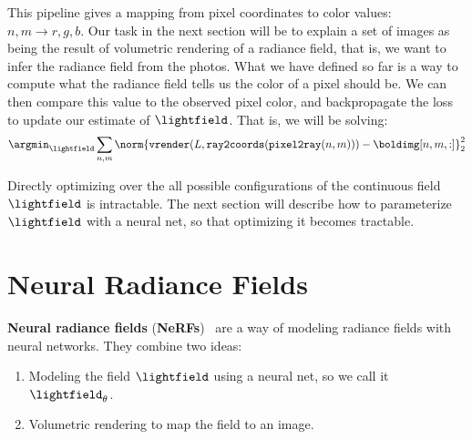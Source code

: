 This pipeline gives a mapping from pixel coordinates to color values: $n,m \rightarrow r,g,b$. Our task in the next section will be to explain a set of images as being the result of volumetric rendering of a radiance field, that is, we want to infer the radiance field from the photos. What we have defined so far is a way to compute what the radiance field tells us the color of a pixel should be. We can then compare this value to the observed pixel color, and backpropagate the loss to update our estimate of $\lightfield$. That is, we will be solving:
\begin{align}
    \argmin_\lightfield \sum_{n,m} \norm{\texttt{vrender}(L, \texttt{ray2coords}(\texttt{pixel2ray}(n,m))) - \boldimg[n,m,:]}^2_2
\end{align}

Directly optimizing over the all possible configurations of the continuous field $\lightfield$ is intractable. The next section will describe how to parameterize $\lightfield$ with a neural net, so that optimizing it becomes tractable.


\section{Neural Radiance Fields}\label{sec:nerfs:nerf_section}

\textbf{Neural radiance fields} (\textbf{NeRFs})~\cite{mildenhall2020nerf} are a way of modeling radiance fields with neural networks. They combine two ideas:
\begin{enumerate}

    \item Modeling the field $\lightfield$ using a neural net, so we call it $\lightfield_\theta$.
    \item Volumetric rendering to map the field to an image.
\end{enumerate}

